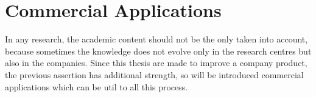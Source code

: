 \section{Commercial Applications}
\label{sec:commercial_applications}
In any research, the academic content should not be the only taken into 
account, because sometimes the knowledge does not evolve only in the research 
centres but also in the companies. Since this thesis are made to improve a 
company product, the previous assertion has additional strength, so will be 
introduced commercial applications which can be util to all this process.